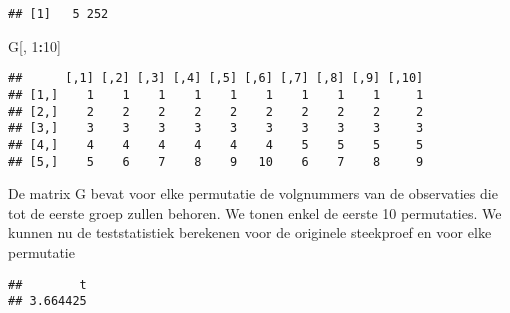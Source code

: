 \documentclass[
  12pt,dutch,coursenotes]{book}
\newenvironment{Shaded}{\begin{snugshade}}{\end{snugshade}}
\newcommand{\CommentTok}[1]{\textcolor[rgb]{0.56,0.35,0.01}{\textit{#1}}}
\newcommand{\ControlFlowTok}[1]{\textcolor[rgb]{0.13,0.29,0.53}{\textbf{#1}}}
\newcommand{\DataTypeTok}[1]{\textcolor[rgb]{0.13,0.29,0.53}{#1}}
\newcommand{\DecValTok}[1]{\textcolor[rgb]{0.00,0.00,0.81}{#1}}
\newcommand{\KeywordTok}[1]{\textcolor[rgb]{0.13,0.29,0.53}{\textbf{#1}}}
\newcommand{\NormalTok}[1]{#1}
\newcommand{\OperatorTok}[1]{\textcolor[rgb]{0.81,0.36,0.00}{\textbf{#1}}}
\newcommand{\StringTok}[1]{\textcolor[rgb]{0.31,0.60,0.02}{#1}}
\theoremstyle{definition}
\theoremstyle{definition}
\theoremstyle{definition}
\theoremstyle{remark}
\begin{document}
\begin{verbatim}
## [1]   5 252
\end{verbatim}

\begin{Shaded}
\begin{Highlighting}[]
\NormalTok{G[, }\DecValTok{1}\OperatorTok{:}\DecValTok{10}\NormalTok{]}
\end{Highlighting}
\end{Shaded}

\begin{verbatim}
##      [,1] [,2] [,3] [,4] [,5] [,6] [,7] [,8] [,9] [,10]
## [1,]    1    1    1    1    1    1    1    1    1     1
## [2,]    2    2    2    2    2    2    2    2    2     2
## [3,]    3    3    3    3    3    3    3    3    3     3
## [4,]    4    4    4    4    4    4    5    5    5     5
## [5,]    5    6    7    8    9   10    6    7    8     9
\end{verbatim}

De matrix G bevat voor elke permutatie de volgnummers van de observaties die tot de eerste groep zullen behoren.
We tonen enkel de eerste 10 permutaties.
We kunnen nu de teststatistiek berekenen voor de originele steekproef en voor elke permutatie

\begin{Shaded}
\end{Shaded}

\begin{verbatim}
##        t 
## 3.664425
\end{verbatim}

\begin{Shaded}
\end{Shaded}
\end{document}
